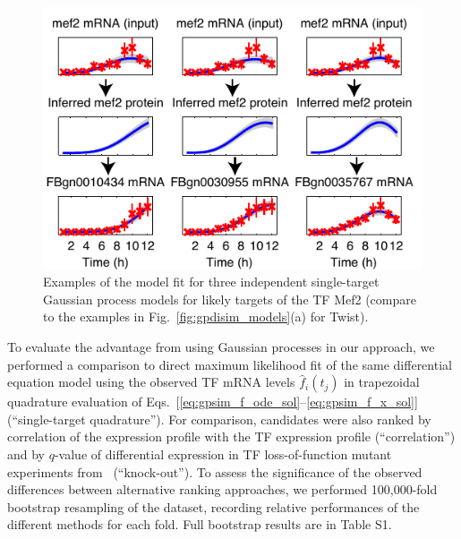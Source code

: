 \documentclass{pnastwo}
\begin{document}
\begin{article}
\begin{figure}[tb]
  \centering
  \includegraphics{fig2}
  \caption{Examples of the model fit for three independent single-target Gaussian process models for
    likely targets of the TF Mef2 (compare to the examples in Fig.~\ref{fig:gpdisim_models}(a) for Twist).\label{fig:gpdisim_mef2_models} }
\end{figure}

To evaluate the advantage from using Gaussian processes in our
approach, we performed a comparison to direct maximum likelihood fit
of the same differential equation model using the observed TF mRNA
levels $\hat{f}_i(t_j)$ in trapezoidal quadrature evaluation of
Eqs.~[\ref{eq:gpsim_f_ode_sol}--\ref{eq:gpsim_f_x_sol}]
(``single-target quadrature'').
For comparison, candidates were also ranked by correlation of the
expression profile with the TF expression profile (``correlation'')
and by $q$-value of differential expression in TF loss-of-function mutant
experiments from~\cite{Sandmann2006a,Sandmann2007} (``knock-out''). 
To assess the significance of the observed differences between
alternative ranking approaches, we performed 100,000-fold bootstrap
resampling of the dataset, 
recording relative performances of the different methods for each
fold. Full bootstrap results are in Table S1.




\end{article}
\end{document}
